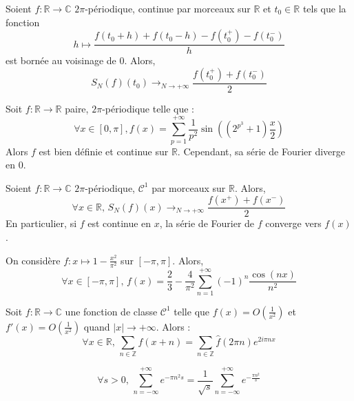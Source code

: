 	
	\begin{theorem}[Dirichlet]
		Soient $f : \mathbb{R} \rightarrow \mathbb{C}$ $2\pi$-périodique, continue par morceaux sur $\mathbb{R}$ et $t_0 \in \mathbb{R}$ tels que la fonction
		\[ h \mapsto \frac{f(t_0 + h) + f(t_0 - h) - f(t_0^+) - f(t_0^-)}{h} \]
		est bornée au voisinage de $0$. Alors,
		\[ S_N(f)(t_0) \longrightarrow_{N \rightarrow +\infty} \frac{f(t_0^+) + f(t_0^-)}{2} \]
	\end{theorem}
	
	\begin{cexample}
		Soit $f : \mathbb{R} \rightarrow \mathbb{R}$ paire, $2\pi$-périodique telle que :
		\[ \forall x \in [0, \pi], f(x) = \sum_{p=1}^{+\infty} \frac{1}{p^2} \sin \left( (2^{p^3} + 1) \frac{x}{2} \right)
		\]
		Alors $f$ est bien définie et continue sur $\mathbb{R}$. Cependant, sa série de Fourier diverge en $0$.
	\end{cexample}
	
	\begin{corollary}
		Soient $f : \mathbb{R} \rightarrow \mathbb{C}$ $2\pi$-périodique, $\mathcal{C}^1$ par morceaux sur $\mathbb{R}$. Alors,
		\[ \forall x \in \mathbb{R}, \, S_N(f)(x) \longrightarrow_{N \rightarrow +\infty} \frac{f(x^+) + f(x^-)}{2} \]
		En particulier, si $f$ est continue en $x$, la série de Fourier de $f$ converge vers $f(x)$.
	\end{corollary}
	
	\begin{example}
		On considère $f : x \mapsto 1 - \frac{x^2}{\pi^2}$ sur $[-\pi, \pi]$. Alors,
		\[ \forall x \in [-\pi, \pi], \, f(x) = \frac{2}{3} - \frac{4}{\pi^2} \sum_{n=1}^{+\infty} (-1)^n \frac{\cos(nx)}{n^2} \]
	\end{example}
	
	
	\begin{theorem}
		Soit $f : \mathbb{R} \rightarrow \mathbb{C}$ une fonction de classe $\mathcal{C}^1$ telle que $f(x) = O \left( \frac{1}{x^2} \right)$ et $f'(x) = O \left( \frac{1}{x^2} \right)$ quand $|x| \longrightarrow +\infty$. Alors :
		\[ \forall x \in \mathbb{R}, \, \sum_{n \in \mathbb{Z}} f(x+n) = \sum_{n \in \mathbb{Z}} \widehat{f}(2 \pi n) e^{2 i \pi n x} \]
	\end{theorem}
	
	\begin{application}
		\[ \forall s > 0, \, \sum_{n=-\infty}^{+\infty} e^{-\pi n^2 s} = \frac{1}{\sqrt{s}} \sum_{n=-\infty}^{+\infty} e^{-\frac{\pi n^2}{s}} \]
	\end{application}
	
